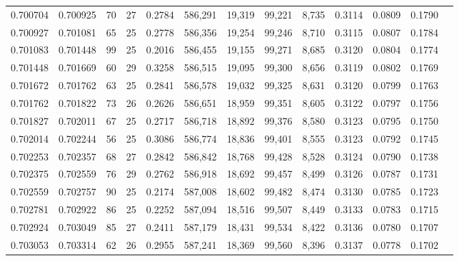 \begin{tabular}{rrrrrrrrrrrrr}
0.700704 & 0.700925 &  70 &  27 &                                     0.2784 & 586,291 &  19,319 &  99,221 &   8,735 & 0.3114 & 0.0809 & 0.1790 \\
0.700927 & 0.701081 &  65 &  25 &                                     0.2778 & 586,356 &  19,254 &  99,246 &   8,710 & 0.3115 & 0.0807 & 0.1784 \\
0.701083 & 0.701448 &  99 &  25 &                                     0.2016 & 586,455 &  19,155 &  99,271 &   8,685 & 0.3120 & 0.0804 & 0.1774 \\
0.701448 & 0.701669 &  60 &  29 &                                     0.3258 & 586,515 &  19,095 &  99,300 &   8,656 & 0.3119 & 0.0802 & 0.1769 \\
0.701672 & 0.701762 &  63 &  25 &                                     0.2841 & 586,578 &  19,032 &  99,325 &   8,631 & 0.3120 & 0.0799 & 0.1763 \\
0.701762 & 0.701822 &  73 &  26 &                                     0.2626 & 586,651 &  18,959 &  99,351 &   8,605 & 0.3122 & 0.0797 & 0.1756 \\
0.701827 & 0.702011 &  67 &  25 &                                     0.2717 & 586,718 &  18,892 &  99,376 &   8,580 & 0.3123 & 0.0795 & 0.1750 \\
0.702014 & 0.702244 &  56 &  25 &                                     0.3086 & 586,774 &  18,836 &  99,401 &   8,555 & 0.3123 & 0.0792 & 0.1745 \\
0.702253 & 0.702357 &  68 &  27 &                                     0.2842 & 586,842 &  18,768 &  99,428 &   8,528 & 0.3124 & 0.0790 & 0.1738 \\
0.702375 & 0.702559 &  76 &  29 &                                     0.2762 & 586,918 &  18,692 &  99,457 &   8,499 & 0.3126 & 0.0787 & 0.1731 \\
0.702559 & 0.702757 &  90 &  25 &                                     0.2174 & 587,008 &  18,602 &  99,482 &   8,474 & 0.3130 & 0.0785 & 0.1723 \\
0.702781 & 0.702922 &  86 &  25 &                                     0.2252 & 587,094 &  18,516 &  99,507 &   8,449 & 0.3133 & 0.0783 & 0.1715 \\
0.702924 & 0.703049 &  85 &  27 &                                     0.2411 & 587,179 &  18,431 &  99,534 &   8,422 & 0.3136 & 0.0780 & 0.1707 \\
0.703053 & 0.703314 &  62 &  26 &                                     0.2955 & 587,241 &  18,369 &  99,560 &   8,396 & 0.3137 & 0.0778 & 0.1702 \\

\end{tabular}
